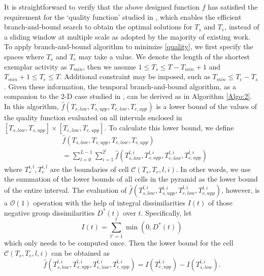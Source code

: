 \documentclass[10pt,twocolumn,letterpaper]{article}
\begin{document}
It is straightforward to verify that the above designed function $f$ has satisfied the requirement for the `quality function' studied in \cite{Lampert}, which enables the efficient branch-and-bound search to obtain the optimal solutions for $T_{s}$ and $T_{e}$, instead of a sliding window at multiple scale as adopted by the majority of existing work. To apply branch-and-bound algorithm to minimize \ref{quality}, we first specify the spaces where $T_{s}$ and $T_{e}$ may take a value. We denote the length of the shortest exemplar activity as $T_{min}$, then we assume $1\leq T_{s}\leq T-T_{min}+1$ and $T_{min}+1\leq T_{e}\leq T$. Additional constraint may be imposed, such as $T_{min}\leq T_{e}-T_{s}$. Given these information,  the temporal branch-and-bound algorithm, as a companion to the 2-D case studied in \cite{Lampert}, can be derived as in Algorithm \ref{Algo:2}.  In this algorithm, $\hat{f}(T_{s,low}, T_{s,upp}, T_{e,low}, T_{e,upp})$ is a lower bound of the values of the quality function evaluated on all intervals enclosed in $[T_{s,low}, T_{s,upp}]\times [T_{e,low}, T_{e,upp}]$. To calculate this lower bound, we define
\begin{equation}
\begin{split}
&\hat{f}(T_{s,low}, T_{s,upp}, T_{e,low}, T_{e,upp})\\
&=\sum^{L-1}_{l=0}\sum^{2^{l}}_{i=1} \hat{f}(T^{l,i}_{s,low}, T^{l,i}_{s,upp}, T^{l,i}_{e,low}, T^{l,i}_{e,upp})
\end{split}
\end{equation}
where $T^{i,l}_{s}, T^{i,l}_{e}$ are the boundaries of cell $\mathcal{C}(T_{s},T_{e}, l,i)$. In other words, we use the summation of the lower bounds of all cells in the pyramid as the lower bound of the entire interval. The evaluation of $\hat{f}(T^{l,i}_{s,low}, T^{l,i}_{s,upp}, T^{l,i}_{e,low}, T^{l,i}_{e,upp})$, however, is a $\mathcal{O}(1)$ operation with the help of integral dissimilarities $I(t)$ of those negative group dissimilarities $D^{*}(t)$ over $t$. Specifically, let
\begin{equation}
I(t)=\sum^{t}_{t'=1} \min(0,D^{*}(t))
\end{equation}
which only needs to be computed once. Then the lower bound for the cell $\mathcal{C}(T_{s},T_{e}, l,i)$ can be obtained as
\begin{equation}
\hat{f}(T^{l,i}_{s,low}, T^{l,i}_{s,upp}, T^{l,i}_{e,low}, T^{l,i}_{e,upp})=I(T^{l,i}_{e,upp})-I(T^{l,i}_{s,low}).
\end{equation}
\end{document}
